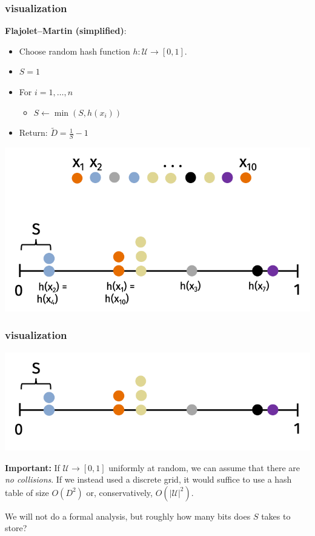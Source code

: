 \documentclass[handout,compress]{beamer}
\begin{document}
\begin{frame}
	\frametitle{visualization}
	\small
	\textbf{Flajolet–Martin (simplified)}:
	\vspace{-.5em}
	\begin{itemize}
		\item Choose random hash function $h: \mathcal{U} \rightarrow [0,1]$.
		\vspace{-.25em}
		\item $S = 1$ 
		\vspace{-.25em}
		\item For $i = 1, \ldots, n$
		\vspace{-.25em}
		\begin{itemize}
			\vspace{-.25em}
			\item $S \leftarrow \min(S, h(x_i))$
		\end{itemize} 
		\vspace{-.25em}
		\item Return: $\tilde{D} = \frac{1}{S} - 1$
	\end{itemize}
\vspace{-.5em}
	\begin{center}
	\includegraphics[width=.75\textwidth]{better_minhash_cut.png}
	\end{center}
\end{frame}

\begin{frame}
	\frametitle{visualization}
	\begin{center}
	\includegraphics[width=.75\textwidth]{minhash_final_dist.png}
	\end{center}
	\textbf{Important:} If $\mathcal{U} \rightarrow [0,1]$ uniformly at random, we can assume that there are \emph{no collisions}. If we instead used a discrete grid, it would suffice to use a hash table of size $O(D^2)$ or, conservatively, ${O}(|\mathcal{U}|^2)$. \vspace{1em}
	
	We will not do a formal analysis, but roughly how many bits does $S$ takes to store?
\end{frame}
\end{document}

